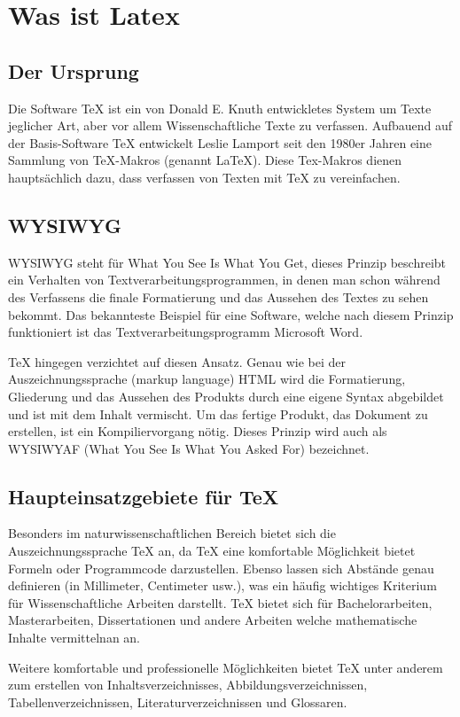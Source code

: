 \chapter{Was ist Latex}
    \section{Der Ursprung}
    Die Software TeX ist ein von Donald E. Knuth entwickletes System um Texte jeglicher Art, aber vor allem Wissenschaftliche Texte zu verfassen. Aufbauend auf der Basis-Software TeX entwickelt Leslie Lamport seit den 1980er Jahren eine Sammlung von TeX-Makros (genannt LaTeX). Diese Tex-Makros dienen hauptsächlich dazu, dass verfassen von Texten mit TeX zu vereinfachen.

    \section{WYSIWYG}
    WYSIWYG steht für What You See Is What You Get, dieses Prinzip beschreibt ein Verhalten von Textverarbeitungsprogrammen, in denen man schon während des Verfassens die finale Formatierung und das Aussehen des Textes zu sehen bekommt. Das bekannteste Beispiel für eine Software, welche nach diesem Prinzip funktioniert ist das Textverarbeitungsprogramm Microsoft Word.

    TeX hingegen verzichtet auf diesen Ansatz. Genau wie bei der Auszeichnungssprache (markup language) HTML wird die Formatierung, Gliederung und das Aussehen des Produkts durch eine eigene Syntax abgebildet und ist mit dem Inhalt vermischt. Um das fertige Produkt, das Dokument zu erstellen, ist ein Kompiliervorgang nötig. Dieses Prinzip wird auch als WYSIWYAF (What You See Is What You Asked For) bezeichnet.

    \section{Haupteinsatzgebiete für TeX}
    Besonders im naturwissenschaftlichen Bereich bietet sich die Auszeichnungssprache TeX an, da TeX eine komfortable Möglichkeit bietet Formeln oder Programmcode darzustellen. Ebenso lassen sich Abstände genau definieren (in Millimeter, Centimeter usw.), was ein häufig wichtiges Kriterium für Wissenschaftliche Arbeiten darstellt. TeX bietet sich für Bachelorarbeiten, Masterarbeiten, Dissertationen und andere Arbeiten welche mathematische Inhalte vermittelnan an.

    Weitere komfortable und professionelle Möglichkeiten bietet TeX unter anderem zum erstellen von Inhaltsverzeichnisses, Abbildungsverzeichnissen, Tabellenverzeichnissen, Literaturverzeichnissen und Glossaren.

